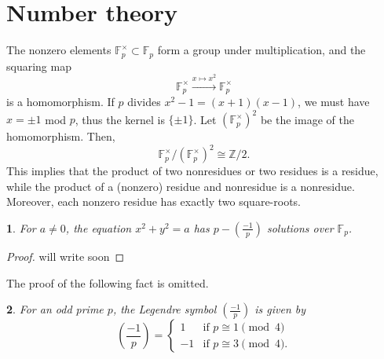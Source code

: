 \documentclass[10pt,a4paper]{amsart}
\numberwithin{equation}{section}
\numberwithin{figure}{section}
\theoremstyle{definition}
\theoremstyle{remark}
\theoremstyle{plain}
\theoremstyle{plain}
\theoremstyle{definition}
\theoremstyle{plain}
\newtheorem{prop}{\protect\propositionname}[section]
\theoremstyle{plain}
\providecommand{\propositionname}{Proposition}
\newcommand{\legendre}[2]{\genfrac{(}{)}{}{}{#1}{#2}}
\begin{document}
\section{Number theory}
The nonzero elements $\mathbb{F}^\times_p \subset \mathbb{F}_p$ form a group under multiplication, and the squaring map
\[
	\mathbb{F}^\times_p \xrightarrow{x \mapsto x^2} \mathbb{F}^\times_p
\]
is a homomorphism. If $p$ divides $x^2 - 1 = (x+1)(x-1)$, we must have $x = \pm 1$ mod $p$, thus the kernel is $\{\pm 1\}$. Let $(\mathbb{F}^\times_p)^2$ be the image of the homomorphism. Then,
\[
	\mathbb{F}^\times_p / (\mathbb{F}^\times_p)^2 \cong \mathbb{Z}/2.
\]
This implies that the product of two nonresidues or two residues is a residue, while the product of a (nonzero) residue and nonresidue is a nonresidue. Moreover, each nonzero residue has exactly two square-roots.
\begin{prop}\label{prop:circle-solutions}
	For $a \neq 0$, the equation $x^2 + y^2 = a$ has $p - \legendre{-1}{p}$ solutions over $\mathbb{F}_p$.
\end{prop}
\begin{proof}
	\color{blue}will write soon\color{black}
\end{proof}
The proof of the following fact is omitted.
\begin{prop}
	For an odd prime $p$, the Legendre symbol $\legendre{-1}{p}$ is given by
	\[
		\legendre{-1}{p} = \left\{
			\begin{matrix}
				1 & \text{if } p \cong 1 \pmod 4 \\
				-1 & \text{if } p \cong 3 \pmod 4.
			\end{matrix}
		\right.
	\]
\end{prop}
\end{document}

